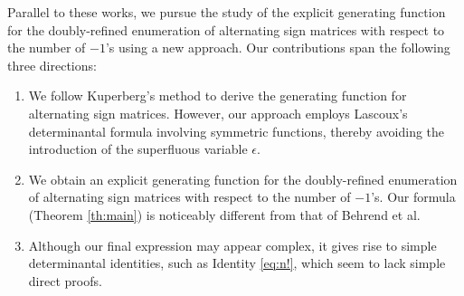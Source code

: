 \documentclass[12pt, a4paper]{amsart} %
\numberwithin{equation}{section}
\begin{document}
\medskip
Parallel to these works, we pursue the study of the 
explicit generating function for the doubly-refined enumeration of alternating sign matrices with respect to the number of $-1$'s
using a new approach. Our contributions span the following three directions:

\begin{enumerate}
    \item[(1)] We follow Kuperberg's method to derive the generating function for alternating sign matrices.  
    However,  our approach employs Lascoux's determinantal formula involving symmetric functions,  
    thereby avoiding the introduction of the superfluous variable $\epsilon$.
    \item[(2)] We obtain an explicit generating function for the doubly-refined enumeration of alternating sign matrices with respect to the number of $-1$'s. 
    Our formula (Theorem \ref{th:main}) is noticeably different from that of Behrend et al.
    \item[(3)] 
Although our final expression may appear complex, it gives rise to simple determinantal identities, such as Identity \eqref{eq:n!}, which seem to lack simple direct proofs.
\end{enumerate}
\end{document}
